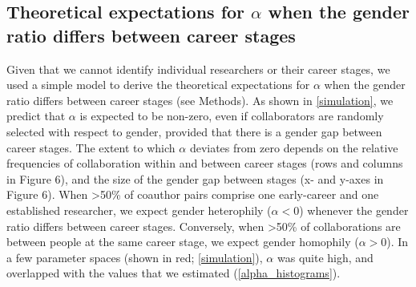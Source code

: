 \documentclass[12pt,]{article}
\begin{document}
\hypertarget{theoretical-expectations-for-alpha-when-the-gender-ratio-differs-between-career-stages}{%
\subsection{\texorpdfstring{Theoretical expectations for \(\alpha\) when
the gender ratio differs between career
stages}{Theoretical expectations for \textbackslash{}alpha when the gender ratio differs between career stages}}\label{theoretical-expectations-for-alpha-when-the-gender-ratio-differs-between-career-stages}}

Given that we cannot identify individual researchers or their career
stages, we used a simple model to derive the theoretical expectations
for \(\alpha\) when the gender ratio differs between career stages (see
Methods). As shown in \autoref{simulation}, we predict that \(\alpha\)
is expected to be non-zero, even if collaborators are randomly selected
with respect to gender, provided that there is a gender gap between
career stages. The extent to which \(\alpha\) deviates from zero depends
on the relative frequencies of collaboration within and between career
stages (rows and columns in Figure 6), and the size of the gender gap
between stages (x- and y-axes in Figure 6). When \textgreater{}50\% of
coauthor pairs comprise one early-career and one established researcher,
we expect gender heterophily (\(\alpha < 0\)) whenever the gender ratio
differs between career stages. Conversely, when \textgreater{}50\% of
collaborations are between people at the same career stage, we expect
gender homophily (\(\alpha > 0\)). In a few parameter spaces (shown in
red; \autoref{simulation}), \(\alpha\) was quite high, and overlapped
with the values that we estimated (\autoref{alpha_histograms}).
\end{document}
